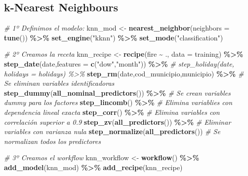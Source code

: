 \documentclass[12pt,a4paper,]{book}
\newenvironment{Shaded}{\begin{snugshade}}{\end{snugshade}}
\newcommand{\AttributeTok}[1]{\textcolor[rgb]{0.13,0.29,0.53}{#1}}
\newcommand{\CommentTok}[1]{\textcolor[rgb]{0.56,0.35,0.01}{\textit{#1}}}
\newcommand{\FunctionTok}[1]{\textcolor[rgb]{0.13,0.29,0.53}{\textbf{#1}}}
\newcommand{\NormalTok}[1]{#1}
\newcommand{\OtherTok}[1]{\textcolor[rgb]{0.56,0.35,0.01}{#1}}
\newcommand{\SpecialCharTok}[1]{\textcolor[rgb]{0.81,0.36,0.00}{\textbf{#1}}}
\newcommand{\StringTok}[1]{\textcolor[rgb]{0.31,0.60,0.02}{#1}}
\newcounter{dummy}
\numberwithin{dummy}{section}
\theoremstyle{ocrenumbox}
\theoremstyle{blacknumex}
\theoremstyle{blacknumbox}
\theoremstyle{ocrenum}
\theoremstyle{ocrenum}
\begin{document}
\hypertarget{k-nearest-neighbours-1}{%
\subsection{k-Nearest Neighbours}\label{k-nearest-neighbours-1}}

\begin{Shaded}
\begin{Highlighting}[]
\CommentTok{\# 1º Definimos el modelo:}
\NormalTok{knn\_mod }\OtherTok{\textless{}{-}} 
  \FunctionTok{nearest\_neighbor}\NormalTok{(}\AttributeTok{neighbors =} \FunctionTok{tune}\NormalTok{()) }\SpecialCharTok{\%\textgreater{}\%} 
  \FunctionTok{set\_engine}\NormalTok{(}\StringTok{"kknn"}\NormalTok{) }\SpecialCharTok{\%\textgreater{}\%} 
  \FunctionTok{set\_mode}\NormalTok{(}\StringTok{"classification"}\NormalTok{)  }

\CommentTok{\# 2º Creamos la receta}
\NormalTok{knn\_recipe }\OtherTok{\textless{}{-}} 
  \FunctionTok{recipe}\NormalTok{(fire }\SpecialCharTok{\textasciitilde{}}\NormalTok{ ., }\AttributeTok{data =}\NormalTok{ training) }\SpecialCharTok{\%\textgreater{}\%} 
  \FunctionTok{step\_date}\NormalTok{(date,}\AttributeTok{features =} \FunctionTok{c}\NormalTok{(}\StringTok{"dow"}\NormalTok{,}\StringTok{"month"}\NormalTok{)) }\SpecialCharTok{\%\textgreater{}\%} 
  \CommentTok{\# step\_holiday(date, holidays = holidays) \%\textgreater{}\% }
  \FunctionTok{step\_rm}\NormalTok{(date,cod\_municipio,municipio) }\SpecialCharTok{\%\textgreater{}\%} \CommentTok{\# Se eliminan variables identificadoras}
  \FunctionTok{step\_dummy}\NormalTok{(}\FunctionTok{all\_nominal\_predictors}\NormalTok{()) }\SpecialCharTok{\%\textgreater{}\%} \CommentTok{\# Se crean variables dummy para los factores}
  \FunctionTok{step\_lincomb}\NormalTok{() }\SpecialCharTok{\%\textgreater{}\%} \CommentTok{\# Elimina variablies con dependencia lineal exacta}
  \FunctionTok{step\_corr}\NormalTok{() }\SpecialCharTok{\%\textgreater{}\%} \CommentTok{\# Elimina variables con correlación superior a 0.9}
  \FunctionTok{step\_zv}\NormalTok{(}\FunctionTok{all\_predictors}\NormalTok{()) }\SpecialCharTok{\%\textgreater{}\%} \CommentTok{\# Eliminar variables con varianza nula}
  \FunctionTok{step\_normalize}\NormalTok{(}\FunctionTok{all\_predictors}\NormalTok{()) }\CommentTok{\# Se normalizan todos los predictores}

\CommentTok{\# 3º Creamos el workflow}
\NormalTok{knn\_workflow }\OtherTok{\textless{}{-}} 
  \FunctionTok{workflow}\NormalTok{() }\SpecialCharTok{\%\textgreater{}\%} 
  \FunctionTok{add\_model}\NormalTok{(knn\_mod) }\SpecialCharTok{\%\textgreater{}\%} 
  \FunctionTok{add\_recipe}\NormalTok{(knn\_recipe)}


\end{Highlighting}
\end{Shaded}
\end{document}

